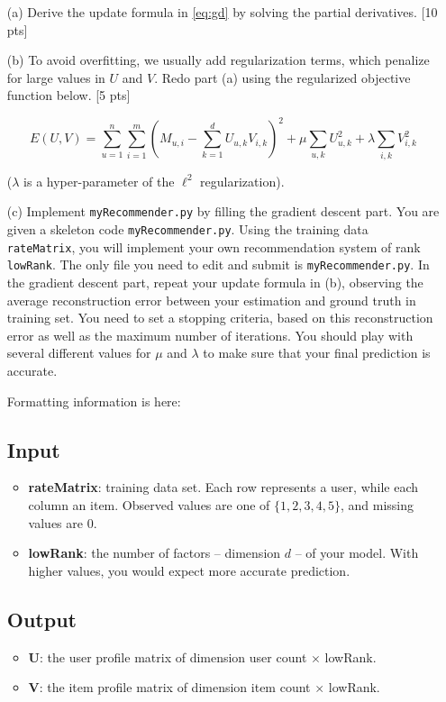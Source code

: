 \documentclass[12pt]{article}
\begin{document}
\begin{itemize}
	\item[(a)] Derive the update formula in \eqref{eq:gd} by
solving the partial derivatives. [10 pts]

\item[(b)] To avoid overfitting, we usually add regularization terms, which penalize for large values in $U$ and $V$.
Redo part (a) using the regularized objective function below. [5
pts]

\begin{equation}
	E(U,V) = \sum_{u=1}^n\sum_{i=1}^m (M_{u,i} - \sum_{k=1}^d U_{u,k}
V_{i,k})^2 + \mu \sum_{u,k} U_{u,k}^2 + \lambda \sum_{i,k}
V_{i,k}^2 \nonumber
\end{equation}

($\lambda$ is a hyper-parameter of the $\ell^2$ regularization).

\item[(c)] Implement \texttt{myRecommender.py} by filling the gradient descent part.
You are given a skeleton code \texttt{myRecommender.py}. Using the
training data \texttt{rateMatrix}, you will implement your own
recommendation system of rank \texttt{lowRank}. The only file you
need to edit and submit is \texttt{myRecommender.py}. In the gradient descent
part, repeat your update formula in (b), observing the average
reconstruction error between your estimation and ground truth in
training set. You need to set a stopping criteria, based on this
reconstruction error as well as the maximum number of iterations.
You should play with several different values for $\mu$ and
$\lambda$ to make sure that your final prediction is accurate.

Formatting information is here:

\subsection{Input}
\begin{itemize}
  \item \textbf{rateMatrix}: training data set. Each row represents a user, while each column an item.
  Observed values are one of $\{1,2,3,4,5\}$, and missing values are
  0.
  \item \textbf{lowRank}: the number of factors -- dimension $d$ -- of your
  model. With higher values, you would expect more accurate
  prediction.
\end{itemize}

\subsection{Output}
\begin{itemize}
  \item \textbf{U}: the user profile matrix of dimension user count
  $\times$ lowRank.
  \item \textbf{V}: the item profile matrix of dimension item count
  $\times$ lowRank.
\end{itemize}


\end{itemize}
\end{document}
